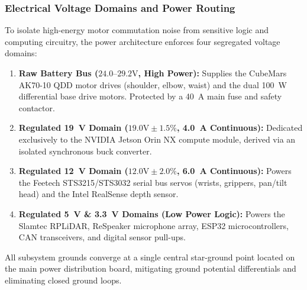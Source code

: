 \subsubsection{Electrical Voltage Domains and Power Routing}
To isolate high-energy motor commutation noise from sensitive logic and computing circuitry, the power architecture enforces four segregated voltage domains:
\begin{enumerate}[leftmargin=1.5em]
  \item \textbf{Raw Battery Bus ($24.0\text{--}29.2\text{V}$, High Power):} Supplies the CubeMars AK70-10 QDD motor drives (shoulder, elbow, waist) and the dual 100~W differential base drive motors. Protected by a 40~A main fuse and safety contactor.
  \item \textbf{Regulated 19~V Domain ($19.0\text{V} \pm 1.5\%$, 4.0~A Continuous):} Dedicated exclusively to the NVIDIA Jetson Orin NX compute module, derived via an isolated synchronous buck converter.
  \item \textbf{Regulated 12~V Domain ($12.0\text{V} \pm 2.0\%$, 6.0~A Continuous):} Powers the Feetech STS3215/STS3032 serial bus servos (wrists, grippers, pan/tilt head) and the Intel RealSense depth sensor.
  \item \textbf{Regulated 5~V \& 3.3~V Domains (Low Power Logic):} Powers the Slamtec RPLiDAR, ReSpeaker microphone array, ESP32 microcontrollers, CAN transceivers, and digital sensor pull-ups.
\end{enumerate}
All subsystem grounds converge at a single central star-ground point located on the main power distribution board, mitigating ground potential differentials and eliminating closed ground loops.

